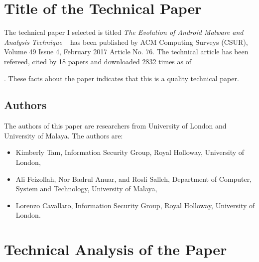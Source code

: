 \documentclass[12pt]{article}
\begin{document}
\section{Title of the Technical Paper} \label{ref:paper_title}
The technical paper I selected is titled \textit{The Evolution of Android Malware and Analysis Technique} ~\cite{Tam:2017:EAM:3022634.3017427} has been published by ACM Computing Surveys (CSUR), Volume 49 Issue 4, February 2017 Article No. 76.  The technical article has been refereed, cited by 18 papers and downloaded 2832 times as of \date{November 18, 2019}. These facts about the paper indicates that this is a quality technical paper.\\

\subsection{Authors}
The authors of this paper are researchers from University of London and University of Malaya. The authors are:
\begin {itemize}
    \item Kimberly Tam, Information Security Group, Royal Holloway, University of London,
    \item Ali Feizollah, Nor Badrul Anuar, and Rosli Salleh, Department of Computer, System and Technology, University of Malaya,
    \item Lorenzo Cavallaro, Information Security Group, Royal Holloway, University of London.
\end{itemize}

\section{Technical Analysis of the Paper}\label{ref:paper_discussion}
\end{document}
